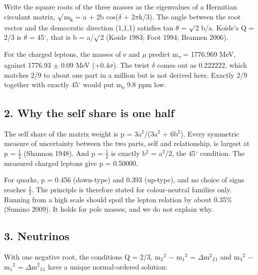 \documentclass[
]{article}
\begin{document}
Write the square roots of the three masses as the eigenvalues of a
Hermitian circulant matrix, \ensuremath{\surd}m\textsubscript{k} = a +
2\textbar b\textbar{} cos(\ensuremath{\delta} + 2\ensuremath{\pi}k/3). The angle between the root vector
and the democratic direction (1,1,1) satisfies tan \ensuremath{\theta} = \ensuremath{\surd}2
\textbar b\textbar/a. Koide's Q = 2/3 is \ensuremath{\theta} = 45\ensuremath{^{\circ}}, that is
\textbar b\textbar{} = a/\ensuremath{\surd}2 (Koide 1983; Foot 1994; Brannen 2006).

For the charged leptons, the masses of e and \ensuremath{\mu} predict
m\textsubscript{\ensuremath{\tau}} = 1776.969 MeV, against 1776.93 \ensuremath{\pm} 0.09 MeV (+0.4\ensuremath{\sigma}).
The twist \ensuremath{\delta} comes out as 0.222222, which matches 2/9 to about one part
in a million but is not derived here. Exactly 2/9 together with exactly
45\ensuremath{^{\circ}} would put m\textsubscript{e} 9.8 ppm low.

\hypertarget{why-the-self-share-is-one-half}{%
\subsection{2. Why the self share is one
half}\label{why-the-self-share-is-one-half}}

The self share of the matrix weight is p = 3a\ensuremath{^{2}}/(3a\ensuremath{^{2}} +
6\textbar b\textbar\ensuremath{^{2}}). Every symmetric measure of uncertainty between
the two parts, self and relationship, is largest at p = \ensuremath{\tfrac12} (Shannon
1948). And p = \ensuremath{\tfrac12} is exactly \textbar b\textbar\ensuremath{^{2}} = a\ensuremath{^{2}}/2, the 45\ensuremath{^{\circ}}
condition. The measured charged leptons give p = 0.50000.

For quarks, p = 0.456 (down-type) and 0.393 (up-type), and no choice of
signs reaches \ensuremath{\tfrac12}. The principle is therefore stated for colour-neutral
families only. Running from a high scale should spoil the lepton
relation by about 0.35\% (Sumino 2009). It holds for pole masses, and we
do not explain why.

\hypertarget{neutrinos}{%
\subsection{3. Neutrinos}\label{neutrinos}}

With one negative root, the conditions Q = 2/3, m\ensuremath{_{2}}\ensuremath{^{2}} \ensuremath{-} m\ensuremath{_{1}}\ensuremath{^{2}} = \ensuremath{\Delta}m\ensuremath{^{2}}\ensuremath{_{2}}\ensuremath{_{1}} and
m\ensuremath{_{3}}\ensuremath{^{2}} \ensuremath{-} m\ensuremath{_{1}}\ensuremath{^{2}} = \ensuremath{\Delta}m\ensuremath{^{2}}\ensuremath{_{3}}\ensuremath{_{1}} have a unique normal-ordered solution:
\end{document}
